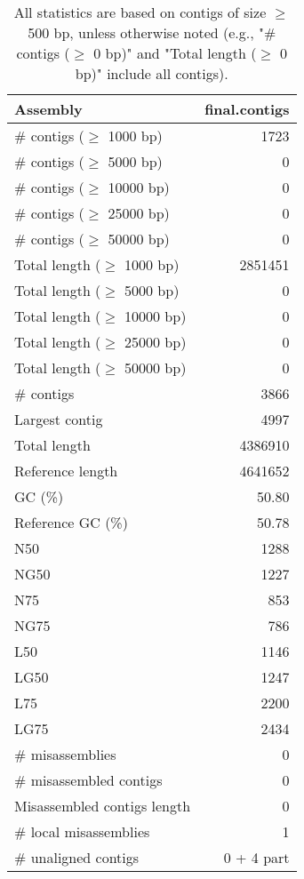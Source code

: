 \documentclass[12pt,a4paper]{article}
\begin{document}
\begin{table}[ht]
\begin{center}
\caption{All statistics are based on contigs of size $\geq$ 500 bp, unless otherwise noted (e.g., "\# contigs ($\geq$ 0 bp)" and "Total length ($\geq$ 0 bp)" include all contigs).}
\begin{tabular}{|l*{1}{|r}|}
\hline
Assembly & final.contigs \\ \hline
\# contigs ($\geq$ 1000 bp) & 1723 \\ \hline
\# contigs ($\geq$ 5000 bp) & 0 \\ \hline
\# contigs ($\geq$ 10000 bp) & 0 \\ \hline
\# contigs ($\geq$ 25000 bp) & 0 \\ \hline
\# contigs ($\geq$ 50000 bp) & 0 \\ \hline
Total length ($\geq$ 1000 bp) & 2851451 \\ \hline
Total length ($\geq$ 5000 bp) & 0 \\ \hline
Total length ($\geq$ 10000 bp) & 0 \\ \hline
Total length ($\geq$ 25000 bp) & 0 \\ \hline
Total length ($\geq$ 50000 bp) & 0 \\ \hline
\# contigs & 3866 \\ \hline
Largest contig & 4997 \\ \hline
Total length & 4386910 \\ \hline
Reference length & 4641652 \\ \hline
GC (\%) & 50.80 \\ \hline
Reference GC (\%) & 50.78 \\ \hline
N50 & 1288 \\ \hline
NG50 & 1227 \\ \hline
N75 & 853 \\ \hline
NG75 & 786 \\ \hline
L50 & 1146 \\ \hline
LG50 & 1247 \\ \hline
L75 & 2200 \\ \hline
LG75 & 2434 \\ \hline
\# misassemblies & 0 \\ \hline
\# misassembled contigs & 0 \\ \hline
Misassembled contigs length & 0 \\ \hline
\# local misassemblies & 1 \\ \hline
\# unaligned contigs & 0 + 4 part \\ \hline

\end{tabular}
\end{center}
\end{table}
\end{document}
